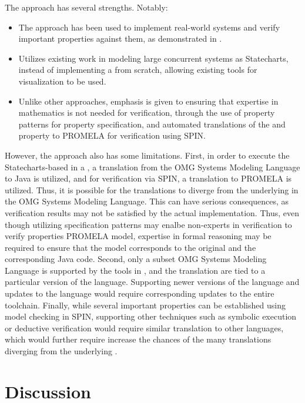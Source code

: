 The \MDA{} approach has several strengths. Notably:
\begin{itemize}
  \item The approach has been used to implement real-world
    systems and verify important properties against them,
    as demonstrated in \cite{PorresECBS08}.
  \item Utilizes existing work in modeling large concurrent
    systems as Statecharts, instead of implementing a \DSL{} from
    scratch, allowing existing tools for visualization to be used.
  \item Unlike other approaches, emphasis is given to ensuring
    that expertise in mathematics is not needed for verification,
    through the use of property patterns for property specification,
    and automated translations of the \BPG{} and property to PROMELA
    for verification using SPIN.
\end{itemize}

However, the approach also has some limitations. First, in order to execute the
Statecharts-based \BPG{} in a \CDSS{}, a translation from the OMG Systems
Modeling Language \cite{OMGSpecUrl} to Java is utilized, and for
verification via SPIN, a translation to PROMELA is utilized. Thus, it
is possible for the translations to diverge from the underlying \BPG{}
in the OMG Systems Modeling Language. This can have serious
consequences, as verification results may not be satisfied by the actual
implementation. Thus, even though utilizing specification patterns
may enalbe non-experts in verification to verify properties PROMELA model,
expertise in formal reasoning may be required to ensure that the model
corresponds to the original \BPG{} and the corresponding Java code.
Second, only a subset OMG Systems Modeling Language is supported
by the tools in \cite{PerezJBI10,PorresECBS08}, and the translation
are tied to a particular version of the language. Supporting newer
versions of the language and updates to the language would require
corresponding updates to the entire toolchain. Finally, while several
important properties can be established using model checking in SPIN,
supporting other techniques such as symbolic execution or deductive
verification would require similar translation to other languages, which
would further require increase the chances of the many translations
diverging from the underlying \BPG{}.

\section{Discussion}\label{sec:related-work-discussion}

